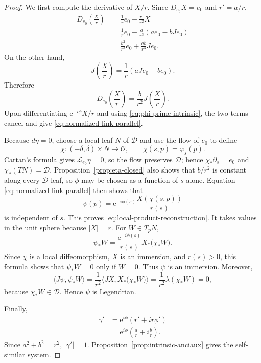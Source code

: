 \documentclass[11pt,a4paper]{article}
\numberwithin{equation}{section}
\newcommand{\Dcal}{\mathcal D}
\newcommand{\ee}{\mathrm e}
\begin{document}
\begin{proof}
We first compute the derivative of $X/r$.  Since $D_{e_0}X=e_0$ and $r'=a/r$,
$$
\begin{aligned}
        D_{e_0}\left(\frac Xr\right)
        &=\frac1r e_0-\frac{r'}{r^2}X\\
        &=\frac1r e_0-\frac{a}{r^3}(a e_0-bJe_0)\\
        &=\frac{b^2}{r^3}e_0+\frac{ab}{r^3}Je_0.
\end{aligned}
$$
On the other hand,
$$
        J\left(\frac Xr\right)
        =\frac1r(aJe_0+b e_0).
$$
Therefore
\begin{equation}
        D_{e_0}\left(\frac Xr\right)
        =\frac{b}{r^2}J\left(\frac Xr\right).
\end{equation}
Upon differentiating $\ee^{-i\phi}X/r$ and using \eqref{eq:phi-prime-intrinsic}, the two terms cancel and give \eqref{eq:normalized-link-parallel}.

Because $d\eta=0$, choose a local leaf $N$ of $\Dcal$ and use the flow of
$e_0$ to define
$$
        \chi:(-\delta,\delta)\times N\longrightarrow\mathcal O,
        \qquad
        \chi(s,p)=\varphi_s(p).
$$
Cartan's formula gives $\mathcal L_{e_0}\eta=0$, so the flow preserves
$\Dcal$; hence $\chi_*\partial_s=e_0$ and
$\chi_*(TN)=\Dcal$.  Proposition~\ref{prop:eta-closed} also shows that
$b/r^2$ is constant along every $\Dcal$-leaf, so $\phi$ may be chosen as a
function of $s$ alone.  Equation \eqref{eq:normalized-link-parallel} then
shows that
$$
        \psi(p)=\ee^{-i\phi(s)}\frac{X(\chi(s,p))}{r(s)}
$$
is independent of $s$.  This proves \eqref{eq:local-product-reconstruction}.
It takes values in the unit sphere because $|X|=r$.  For $W\in T_pN$,
$$
        \psi_*W
        =\frac{\ee^{-i\phi(s)}}{r(s)}X_*\bigl(\chi_*W\bigr).
$$
Since $\chi$ is a local diffeomorphism, $X$ is an immersion, and $r(s)>0$,
this formula shows that $\psi_*W=0$ only if $W=0$.  Thus $\psi$ is an
immersion.  Moreover,
$$
        \langle J\psi,\psi_*W\rangle
        =\frac1{r^2}\langle JX,X_*\bigl(\chi_*W\bigr)\rangle
        =\frac1{r^2}\lambda(\chi_*W)=0,
$$
because $\chi_*W\in\Dcal$.  Hence $\psi$ is Legendrian.

Finally,
$$
\begin{aligned}
        \gamma'
        &=\ee^{i\phi}(r'+ir\phi')\\
        &=\ee^{i\phi}\left(\frac ar+i\frac br\right).
\end{aligned}
$$
Since $a^2+b^2=r^2$, $|\gamma'|=1$.  Proposition~\ref{prop:intrinsic-anciaux} gives the self-similar system.
\end{proof}
\end{document}
